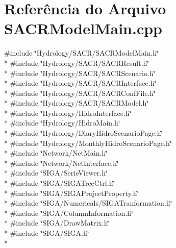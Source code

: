 \section{Referência do Arquivo S\+A\+C\+R\+Model\+Main.\+cpp}
\label{_s_a_c_r_model_main_8cpp}
{\ttfamily \#include \char`\"{}Hydrology/\+S\+A\+C\+R/\+S\+A\+C\+R\+Model\+Main.\+h\char`\"{}}\\*
{\ttfamily \#include \char`\"{}Hydrology/\+S\+A\+C\+R/\+S\+A\+C\+R\+Result.\+h\char`\"{}}\\*
{\ttfamily \#include \char`\"{}Hydrology/\+S\+A\+C\+R/\+S\+A\+C\+R\+Scenario.\+h\char`\"{}}\\*
{\ttfamily \#include \char`\"{}Hydrology/\+S\+A\+C\+R/\+S\+A\+C\+R\+Interface.\+h\char`\"{}}\\*
{\ttfamily \#include \char`\"{}Hydrology/\+S\+A\+C\+R/\+S\+A\+C\+R\+Conf\+File.\+h\char`\"{}}\\*
{\ttfamily \#include \char`\"{}Hydrology/\+S\+A\+C\+R/\+S\+A\+C\+R\+Model.\+h\char`\"{}}\\*
{\ttfamily \#include \char`\"{}Hydrology/\+Hidro\+Interface.\+h\char`\"{}}\\*
{\ttfamily \#include \char`\"{}Hydrology/\+Hidro\+Main.\+h\char`\"{}}\\*
{\ttfamily \#include \char`\"{}Hydrology/\+Diary\+Hidro\+Scenario\+Page.\+h\char`\"{}}\\*
{\ttfamily \#include \char`\"{}Hydrology/\+Monthly\+Hidro\+Scenario\+Page.\+h\char`\"{}}\\*
{\ttfamily \#include \char`\"{}Network/\+Net\+Main.\+h\char`\"{}}\\*
{\ttfamily \#include \char`\"{}Network/\+Net\+Interface.\+h\char`\"{}}\\*
{\ttfamily \#include \char`\"{}S\+I\+G\+A/\+Serie\+Viewer.\+h\char`\"{}}\\*
{\ttfamily \#include \char`\"{}S\+I\+G\+A/\+S\+I\+G\+A\+Tree\+Ctrl.\+h\char`\"{}}\\*
{\ttfamily \#include \char`\"{}S\+I\+G\+A/\+S\+I\+G\+A\+Project\+Property.\+h\char`\"{}}\\*
{\ttfamily \#include \char`\"{}S\+I\+G\+A/\+Numericals/\+S\+I\+G\+A\+Tranformation.\+h\char`\"{}}\\*
{\ttfamily \#include \char`\"{}S\+I\+G\+A/\+Column\+Information.\+h\char`\"{}}\\*
{\ttfamily \#include \char`\"{}S\+I\+G\+A/\+Draw\+Matrix.\+h\char`\"{}}\\*
{\ttfamily \#include \char`\"{}S\+I\+G\+A/\+S\+I\+G\+A.\+h\char`\"{}}\\*
